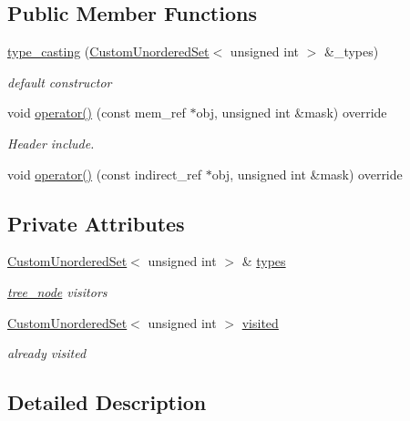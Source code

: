 \subsection*{Public Member Functions}
\begin{DoxyCompactItemize}
\item 
\hyperlink{structtype__casting_a7388d63d2d4363e4b48cbfa313f2be93}{type\+\_\+casting} (\hyperlink{classCustomUnorderedSet}{Custom\+Unordered\+Set}$<$ unsigned int $>$ \&\+\_\+types)
\begin{DoxyCompactList}\small\item\em default constructor \end{DoxyCompactList}\item 
void \hyperlink{structtype__casting_afbe475bc88d774a048c1b2e5d5250049}{operator()} (const mem\+\_\+ref $\ast$obj, unsigned int \&mask) override
\begin{DoxyCompactList}\small\item\em Header include. \end{DoxyCompactList}\item 
void \hyperlink{structtype__casting_a463829f253347a18a6275a5c15b40ebf}{operator()} (const indirect\+\_\+ref $\ast$obj, unsigned int \&mask) override
\end{DoxyCompactItemize}
\subsection*{Private Attributes}
\begin{DoxyCompactItemize}
\item 
\hyperlink{classCustomUnorderedSet}{Custom\+Unordered\+Set}$<$ unsigned int $>$ \& \hyperlink{structtype__casting_a29c7e1c62a1db476fa29340fb61f6722}{types}
\begin{DoxyCompactList}\small\item\em \hyperlink{classtree__node}{tree\+\_\+node} visitors \end{DoxyCompactList}\item 
\hyperlink{classCustomUnorderedSet}{Custom\+Unordered\+Set}$<$ unsigned int $>$ \hyperlink{structtype__casting_ac4fcdb1776a326d10eb4c3d76b682dd3}{visited}
\begin{DoxyCompactList}\small\item\em already visited \end{DoxyCompactList}\end{DoxyCompactItemize}


\subsection{Detailed Description}


